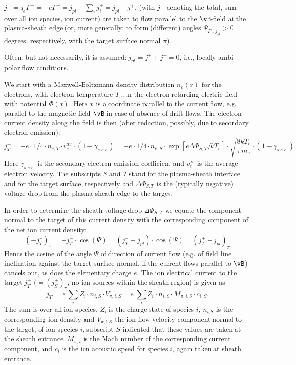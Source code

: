 $j^-=q_e\Gamma^- = -e\Gamma^- = j_{pl} - \sum_i j^+_i = j_{pl} -  j^+$,
(with $j^+$ denoting the total, sum over all ion species, ion current)
are taken to
flow parallel to the $\vB$-field at the plasma-sheath edge (or, more generally: to form (different) angles $\Psi_{\Gamma^+,j_{pl}} > 0$ degrees, respectively,  with the target surface normal $\pi$).

Often, but not necessarily, it is assumed: $j_{pl} = j^+ + j^- =
0$, i.e., locally ambi-polar flow conditions.

We start with a Maxwell-Boltzmann density distribution $n_e(x)$
for the electrons, with electron temperature $T_e$, in the
electron retarding electric field with potential $\Phi(x)$. Here $x$
is a coordinate parallel to the current flow, e.g. parallel to the magnetic field $\vB$ in case of absence of drift flows. The
electron current density along the field is then (after reduction,
possibly, due to secondary electron emission):
\begin{displaymath}
j^-_T = -e \cdot 1/4 \cdot n_{e,T} \cdot v_e^{av} \cdot
(1-\gamma_{s.e.e.}) = -e \cdot 1/4  \cdot n_{e,S} \cdot \exp[e
\Delta\Phi_{S,T}/kT_e] \cdot \sqrt{\frac{8 kT_e}{\pi m_e}} \cdot
(1-\gamma_{s.e.e.})
\end{displaymath}
Here $\gamma_{s.e.e.}$ is the secondary electron emission
coefficient and $v_e^{av}$ is the average electron velocity. The subscripts $S$ and $T$ stand for the plasma-sheath
interface and for the target surface, respectively and $
\Delta\Phi_{S,T}$ is the (typically negative) voltage drop from
the plasma sheath edge to the target.

In order to determine the sheath voltage drop $\Delta\Phi_{S,T}$
we equate the component normal to the target of this current
density with the corresponding component of the net ion current
density:
\begin{displaymath}
\left(-j^-_T\right)_{\pi} =-j^-_T \cdot \cos(\Psi) =
(j^+_T - j_{pl}) \cdot \cos(\Psi) = \left(j^+_T - j_{pl}\right)_{\pi}
\end{displaymath}
Hence the cosine of the angle $\Psi$ of direction of current flow
(e.g. of field line inclination
against the target surface normal, if the current flows parallel to $\vB$) cancels out, as does the elementary
charge $e$. The ion electrical current to the target $j^+_T$ ($ = (j^+_S)_{\pi}$, no ion
sources within the sheath region) is given as
\begin{displaymath}
j^+_T = e \ \sum_i Z_i \cdot n_{i,S} \cdot {{V}_{\pi,i,S}}
 = e \ \sum_i Z_i \cdot n_{i,S} \cdot M_{\pi,i,S} \cdot c_{i,S}.
\end{displaymath}
The sum is over all ion species, $Z_i$ is the charge state of
species $i$, $n_{i,S}$ is the corresponding ion density and
${{V}_{\pi,i,S}}$ the ion flow
velocity component normal to the target, of ion species $i$, subscript $S$ indicated that these values are taken at the sheath entrance.
$M_{\pi,i}$ is the Mach number of the corresponding current component, and $c_i$
is the ion acoustic speed for species $i$, again taken at sheath entrance.

